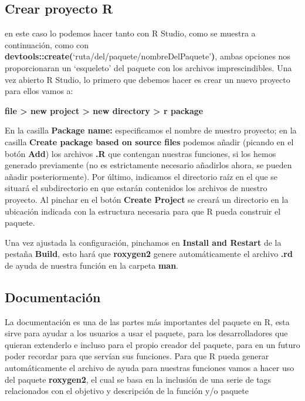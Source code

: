 \subsection{Crear proyecto R}

en este caso lo podemos hacer tanto con R Studio, como se muestra a continuaci\'on,
como con \textbf{devtools::create(}\enquote*{ruta/del/paquete/nombreDelPaquete}\textbf{)}, ambas opciones nos
proporcionaran un \enquote*{esqueleto} del paquete con los archivos imprescindibles.
Una vez abierto R Studio, lo primero que debemos hacer es crear un nuevo proyecto para
ellos vamos a: 
\begin{center}
    \textbf{file > new project > new directory > r package} 
\end{center}

En la casilla \textbf{Package name:} especificamos el nombre de nuestro proyecto; en la casilla
\textbf{Create package based on source files} podemos a\~nadir (picando en el bot\'on \textbf{Add}) los
archivos \textbf{.R} que contengan nuestras funciones, si los hemos generado previamente (no es
estrictamente necesario a\~nadirlos ahora, se pueden a\~nadir posteriormente).
Por \'ultimo, indicamos el directorio ra\'iz en el que se situar\'a el subdirectorio en que estar\'an
contenidos los archivos de nuestro proyecto. 
Al pinchar en el bot\'on \textbf{Create Project} se crear\'a un directorio en la ubicaci\'on indicada con la
estructura necesaria para que R pueda construir el paquete.

Una vez ajustada la configuración, pinchamos en \textbf{Install and Restart} de la pestaña \textbf{Build}, esto hará que \textbf{roxygen2} genere automáticamente el archivo \textbf{.rd} de ayuda de nuestra función en la carpeta \textbf{man}.

\subsection{Documentaci\'on}

La documentaci\'on es una de las partes m\'as importantes del paquete en R, esta sirve para
ayudar a los usuarios a usar el paquete, para los desarrolladores que quieran extenderlo e
incluso para el propio creador del paquete, para en un futuro poder recordar para que serv\'ian
sus funciones.
Para que R pueda generar autom\'aticamente el archivo de ayuda para nuestras funciones
vamos a hacer uso del paquete \textbf{roxygen2}, el cual se basa en la inclusi\'on de una serie de tags relacionados con el objetivo y descripci\'on de la funci\'on y/o paquete 

